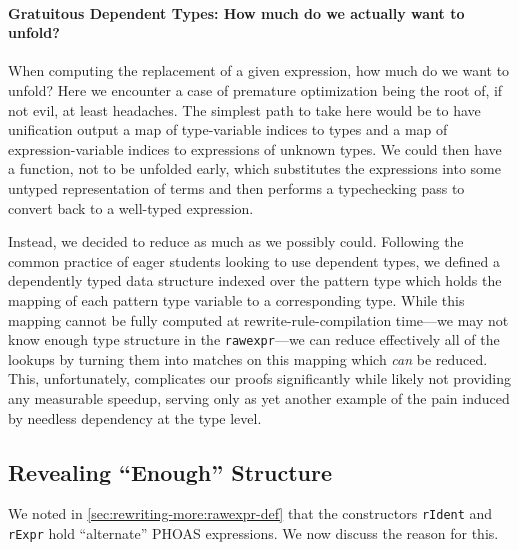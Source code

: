 \paragraph{Gratuitous Dependent Types: How much do we actually want to unfold?}
When computing the replacement of a given expression, how much do we want to unfold?
Here we encounter a case of premature optimization being the root of, if not evil, at least headaches.
The simplest path to take here would be to have unification output a map of type-variable indices to types and a map of expression-variable indices to expressions of unknown types.
We could then have a function, not to be unfolded early, which substitutes the expressions into some untyped representation of terms and then performs a typechecking pass to convert back to a well-typed expression.

Instead, we decided to reduce as much as we possibly could.
Following the common practice of eager students looking to use dependent types, we defined a dependently typed data structure indexed over the pattern type which holds the mapping of each pattern type variable to a corresponding type.
While this mapping cannot be fully computed at rewrite-rule-compilation time---we may not know enough type structure in the \texttt{rawexpr}---we can reduce effectively all of the lookups by turning them into matches on this mapping which \emph{can} be reduced.
This, unfortunately, complicates our proofs significantly while likely not providing any measurable speedup, serving only as yet another example of the pain induced by needless dependency at the type level.


\subsection{Revealing ``Enough'' Structure}\label{sec:rewriting-more:revealing-enough-structure}
We noted in \autoref{sec:rewriting-more:rawexpr-def} that the constructors \texttt{rIdent} and \texttt{rExpr} hold ``alternate'' PHOAS expressions.
We now discuss the reason for this.


